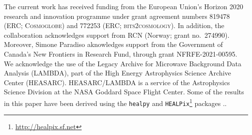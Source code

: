 \begin{acknowledgements}
  The current work has received funding from the European
  Union’s Horizon 2020 research and innovation programme under grant
  agreement numbers 819478 (ERC; \textsc{Cosmoglobe}) and 772253 (ERC;
  \textsc{bits2cosmology}).
  In
  addition, the collaboration acknowledges support from
  RCN (Norway; grant no.\ 274990). Moreover, Simone Paradiso aknowledges
  support from the Government of Canada's New Frontiers in Research Fund,
  through grant NFRFE-2021-00595.
  We acknowledge the use of the Legacy Archive for Microwave Background Data
  Analysis (LAMBDA), part of the High Energy Astrophysics Science Archive Center
  (HEASARC). HEASARC/LAMBDA is a service of the Astrophysics Science Division at
  the NASA Goddard Space Flight Center.  
  Some of the results in this paper have been derived using the \texttt{healpy}
  and \texttt{HEALPix}\footnote{\url{http://healpix.sf.net}} packages
  \citep{gorski2005, Zonca2019}..
\end{acknowledgements}
